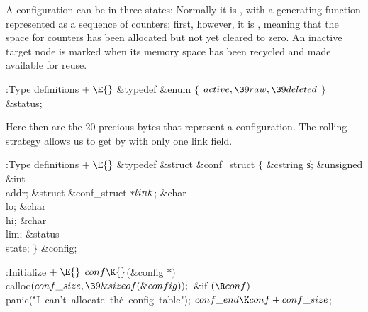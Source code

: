 A configuration can be in three states: Normally it is %
,
with a generating function represented as a sequence of counters;
first, however, it is , meaning that the space for counters has
been
allocated but not yet cleared to zero. An inactive target node is
marked  when its memory space has been recycled and made
available for reuse.

\Y\B\4:Type definitions\X${}\mathrel+\E{}$\6
\&{typedef} \&{enum} ${}\{{}$\1\6
${}\\{active},\39\\{raw},\39\\{deleted}{}$\2\6
${}\}{}$ \&{status};\par
\fi

Here then are the 20 precious bytes that represent a
configuration.
The rolling strategy allows us to get by with only one link field.

\Y\B\4:Type definitions\X${}\mathrel+\E{}$\6
\&{typedef} \&{struct} \&{conf\_struct} ${}\{{}$\1\6
\&{cstring} \|s;\6
\&{unsigned} \&{int} \\{addr};\6
\&{struct} \&{conf\_struct} ${}{*}\\{link}{}$;\6
\&{char} \\{lo};\6
\&{char} \\{hi};\6
\&{char} \\{lim};\6
\&{status} \\{state};\2%
\6
${}\}{}$ \&{config};\par
\fi

\B{}:Initialize\X${}\mathrel+\E{}$\6
$\\{conf}\K{}$(\&{config} ${}{*}){}$ \\{calloc}${}(\\{conf\_size},\39%
\&{sizeof}(\&{config}));{}$\6
\&{if} ${}(\R\\{conf}){}$\1\5
\\{panic}(\.{"I\ can't\ allocate\ th}\)\.{e\ config\ table"});\2\6
${}\\{conf\_end}\K\\{conf}+\\{conf\_size}{}$;\par
\fi

